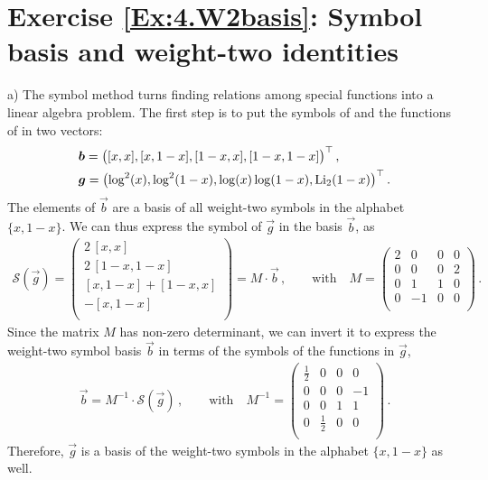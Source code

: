 \section*{Exercise \ref{Ex:4.W2basis}: Symbol basis and weight-two identities}
\label{Sol:4.W2basis}
\noindent
a) The symbol method turns finding relations among special functions into a linear algebra problem. The first step is to put the symbols of  and the functions of  in two vectors:
\begin{align}
& \vec{b} = \bigl( [x,x] , [x,1-x], [1-x,x], [1-x,1-x] \bigr)^{\top} \,, \\
& \vec{g} = \bigl( \log^2(x),  \log^2 (1-x),  \log(x) \log (1-x),  {\rm Li}_{2}(1-x) \bigr)^{\top} \,.
\end{align}
The elements of $\vec{b}$ are a basis of all weight-two symbols in the alphabet $\{x, 1-x\}$. We can thus express the symbol of $\vec{g}$ in the basis $\vec{b}$, as
\begin{align}
\mathcal{S}(\vec{g}) = \begin{pmatrix} 
2 \, [x,x] \\
2 \, [1-x,1-x] \\
[x,1-x]+[1-x,x] \\
- [x,1-x] \\
\end{pmatrix} = M \cdot \vec{b} \,, \qquad \text{with} \quad 
M = \begin{pmatrix}
2 & 0 & 0 & 0 \\
0 & 0 & 0 & 2 \\
0 & 1 & 1 & 0 \\
0 & -1 & 0 & 0 \\
\end{pmatrix} \,.
\end{align}
Since the matrix $M$ has non-zero determinant, we can invert it to express the weight-two symbol basis $\vec{b}$ in terms of the symbols of the functions in $\vec{g}$,
\begin{align} \label{eq:b2g}
\vec{b} = M^{-1} \cdot \mathcal{S}(\vec{g}) \,, \qquad \text{with} \quad 
M^{-1} = \begin{pmatrix}
\frac{1}{2} & 0 & 0 & 0 \\
0 & 0 & 0 & -1 \\
0 & 0 & 1 & 1 \\
0 & \frac{1}{2} & 0 & 0 \\
\end{pmatrix} \,.
\end{align}
Therefore, $\vec{g}$ is a basis of the weight-two symbols in the alphabet $\{x,1-x\}$ as well.

